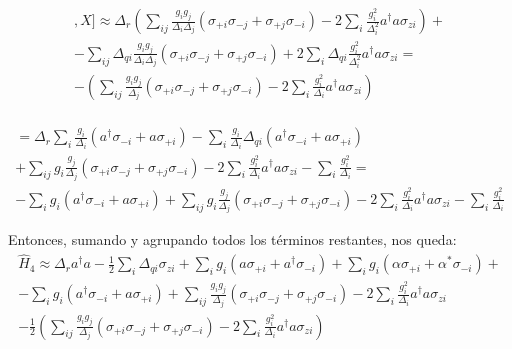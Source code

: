 \begin{multline}
[[H,X],X] \approx \Delta_r \left(\sum\limits_{ij} \frac{g_i g_j}{\Delta_i \Delta_j} \left(\sigma_{+i} \sigma_{-j} + \sigma_{+j} \sigma_{-i}\right) -
2 \sum\limits_{i} \frac{g_i^2}{\Delta_i^2} a^\dagger a \sigma_{zi} \right) + \\
- \sum\limits_{ij} \Delta_{qi}  \frac{g_i g_j}{\Delta_i \Delta_j} \left(\sigma_{+i} \sigma_{-j} + \sigma_{+j} \sigma_{-i}\right) +
2 \sum\limits_{i} \Delta_{qi} \frac{g_i^2}{\Delta_i^2} a^\dagger a \sigma_{zi} = \\
- \left(\sum\limits_{ij} \frac{g_i g_j}{\Delta_j} \left(\sigma_{+i} \sigma_{-j} + \sigma_{+j} \sigma_{-i}\right) -
2 \sum\limits_{i} \frac{g_i^2}{\Delta_i} a^\dagger a \sigma_{zi} \right) \\
\end{multline}

\begin{multline}
    [H,X] = \Delta_r \sum\limits_i \frac{g_i} {\Delta_i} (a^\dagger \sigma_{-i} + a \sigma_{+i}) - \sum\limits_i \frac{g_i} {\Delta_i} \Delta_{qi} (a^\dagger \sigma_{-i} + a \sigma_{+i}) \\
+ \sum\limits_{ij} g_i \frac{g_j}{\Delta_j} \left(\sigma_{+i} \sigma_{-j} + \sigma_{+j} \sigma_{-i}\right) - 2 \sum\limits_{i} \frac{g_i^2}{\Delta_i} a^\dagger a \sigma_{zi} - \sum\limits_i \frac{g_i^2} {\Delta_i} = \\
- \sum\limits_i g_i (a^\dagger \sigma_{-i} + a \sigma_{+i}) + \sum\limits_{ij} g_i \frac{g_j}{\Delta_j} \left(\sigma_{+i} \sigma_{-j} + \sigma_{+j} \sigma_{-i}\right) - 2 \sum\limits_{i} \frac{g_i^2}{\Delta_i} a^\dagger a \sigma_{zi} - \sum\limits_i \frac{g_i^2} {\Delta_i}
\end{multline}

Entonces, sumando y agrupando todos los términos restantes, nos queda:
\begin{multline}
\hat{H}_4 \approx \Delta_r a^\dagger a - \frac{1}{2} \sum\limits_i \Delta_{qi} \sigma_{zi} + \sum\limits_i g_i (a \sigma_{+i} + a^\dagger \sigma_{-i}) + \sum\limits_i g_i (\alpha \sigma_{+i} + \alpha^* \sigma_{-i}) + \\
- \sum\limits_i g_i (a^\dagger \sigma_{-i} + a \sigma_{+i}) + \sum\limits_{ij} \frac{g_i g_j}{\Delta_j} \left(\sigma_{+i} \sigma_{-j} + \sigma_{+j} \sigma_{-i}\right) - 2 \sum\limits_{i} \frac{g_i^2}{\Delta_i} a^\dagger a \sigma_{zi} \\
- \frac{1}{2} \left(\sum\limits_{ij} \frac{g_i g_j}{\Delta_j} \left(\sigma_{+i} \sigma_{-j} + \sigma_{+j} \sigma_{-i}\right) -
2 \sum\limits_{i} \frac{g_i^2}{\Delta_i} a^\dagger a \sigma_{zi} \right)
\end{multline}

